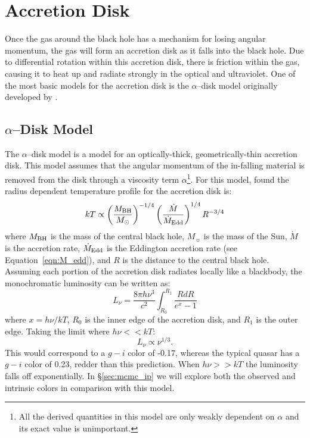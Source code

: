 \section{Accretion Disk} \label{sec:AD}

Once the gas around the black hole has a mechanism for losing angular momentum, the gas will form an accretion disk as it falls into the black hole.  Due to differential rotation within this accretion disk, there is friction within the gas, causing it to heat up and radiate strongly in the optical and ultraviolet.  One of the most basic models for the accretion disk is the $\alpha$--disk model originally developed by \citet{Shakura:1973}.

\subsection{$\alpha$--Disk Model}

The $\alpha$--disk model is a model for an optically-thick, geometrically-thin accretion disk.  This model assumes that the angular momentum of the in-falling material is removed from the disk through a viscosity term $\alpha$\footnote{All the derived quantities in this model are only weakly dependent on $\alpha$ and its exact value is unimportant.}.  For this model, \citet{Shakura:1973}  found the radius dependent temperature profile for the accretion disk is:
\begin{equation} \label{disk_temp}
 kT \propto \left( \frac{M_{\rm BH}}{M_\sun} \right)^{-1/4} \left( \frac{\dot{M}}{\dot{M}_{\rm Edd}} \right)^{1/4} R^{-3/4}
\end{equation}
where $M_{\rm BH}$ is the mass of the central black hole, $M_\sun$ is the mass of the Sun, $\dot{M}$ is the accretion rate, $\dot{M}_{\rm Edd}$ is the Eddington accretion rate (see Equation~\ref{eqn:M_edd}), and $R$ is the distance to the central black hole.  Assuming each portion of the accretion disk radiates locally like a blackbody, the monochromatic luminosity can be written as:
\begin{equation}
 L_{\nu} = \frac{8\pi h \nu^3}{c^2} \int_{R_0}^{R_1} \frac{RdR}{e^x-1}
\end{equation}
where $x=h\nu/kT$, $R_0$ is the inner edge of the accretion disk, and $R_1$ is the outer edge.  Taking the limit where $h\nu<<kT$:
\begin{equation}
 L_{\nu} \propto \nu^{1/3}.
\end{equation}
This would correspond to a $g-i$ color of -0.17, whereas the typical quasar has a $g-i$ color of 0.23, redder than this prediction.
When $h\nu>>kT$ the luminosity falls off exponentially. In \S\ref{sec:mcmc_ip} we will explore both the observed and intrinsic colors in comparison with this model.

